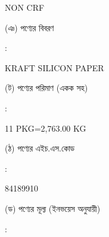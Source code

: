 \documentclass[12pt]{article}
\newcommand{\good}{KRAFT SILICON PAPER}
\newcommand{\pkg}{11 PKG=2,763.00 KG}
\newcommand{\crf}{NON CRF}
\newcommand{\crfdt}{}
\newcommand{\hscode}{84189910}
\begin{document}
\begin{minipage}[t]{0.53\linewidth}
{\crf} \hspace{2em} {\crfdt}
\\
\end{minipage}
\begin{minipage}[t]{0.05\linewidth}
\hspace*{1em}
\end{minipage}
\begin{minipage}[t]{0.40\linewidth}
(ঞ) পণ্যের বিবরণ
\end{minipage}
\begin{minipage}[t]{0.02\linewidth}
:
\end{minipage}
\begin{minipage}[t]{0.53\linewidth}
{\good}
\\
\end{minipage}
\begin{minipage}[t]{0.05\linewidth}
\hspace*{1em}
\end{minipage}
\begin{minipage}[t]{0.40\linewidth}
(ট) পণ্যের পরিমাণ (একক সহ)
\end{minipage}
\begin{minipage}[t]{0.02\linewidth}
:
\end{minipage}
\begin{minipage}[t]{0.53\linewidth}
{\pkg}
\\
\end{minipage}
\begin{minipage}[t]{0.05\linewidth}
\hspace*{1em}
\end{minipage}
\begin{minipage}[t]{0.40\linewidth}
(ঠ) পণ্যের এইচ.এস.কোড
\end{minipage}
\begin{minipage}[t]{0.02\linewidth}
:
\end{minipage}
\begin{minipage}[t]{0.53\linewidth}
{\hscode}
\\
\end{minipage}
\begin{minipage}[t]{0.05\linewidth}
\hspace*{1em}
\end{minipage}
\begin{minipage}[t]{0.40\linewidth}
(ড) পণ্যের মূল্য (ইনভয়েস অনুযায়ী)
\end{minipage}
\begin{minipage}[t]{0.02\linewidth}
:
\end{minipage}
\end{document}
